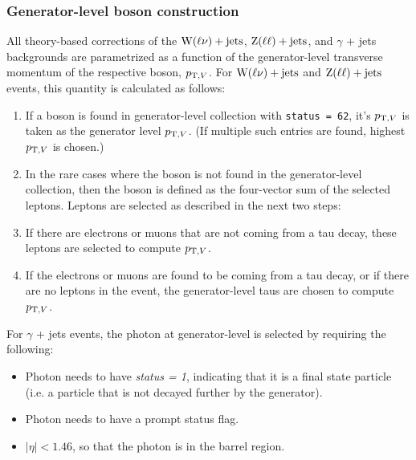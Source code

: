 \subsubsection{Generator-level boson construction}
All theory-based corrections of the $\mathrm{W}(\ell\nu)+\textrm{jets}$, $\mathrm{Z}(\ell\ell)+\textrm{jets}$, and $\gamma$ + jets backgrounds are parametrized as a function of the 
generator-level transverse momentum of the respective boson, $p_{\mathrm{T},V}$. For $\mathrm{W}(\ell\nu)+\textrm{jets}$ and $\mathrm{Z}(\ell\ell)+\textrm{jets}$ events, this quantity is calculated as follows:

\begin{enumerate}
  \item If a boson is found in generator-level collection with \texttt{status = 62}, it's $p_{\mathrm{T},V}$ is taken as the generator level $p_{\mathrm{T},V}$.
  (If multiple such entries are found, highest $p_{\mathrm{T},V}$ is chosen.)
  \item In the rare cases where the boson is not found in the generator-level collection, then the boson is defined as the four-vector sum of the selected leptons.
  Leptons are selected as described in the next two steps:
  \item If there are electrons or muons that are not coming from a tau decay, these leptons are selected to compute $p_{\mathrm{T},V}$.
  \item If the electrons or muons are found to be coming from a tau decay, or if there are no leptons in the event, the generator-level taus 
  are chosen to compute $p_{\mathrm{T},V}$.
\end{enumerate}

For $\gamma$ + jets events, the photon at generator-level is selected by requiring the following:
\begin{itemize}
    \item Photon needs to have \textit{status = 1}, indicating that it is a final state particle (i.e. a particle that is not decayed further by the generator). 
    \item Photon needs to have a prompt status flag. 
    \item $|\eta|<1.46$, so that the photon is in the barrel region. 
\end{itemize}

